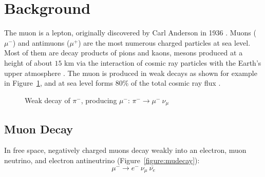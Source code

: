 
\section{Background}\label{background}

The muon is a lepton, originally discovered by Carl Anderson in 1936
\cite{anderson}. Muons ($\mu^-$) and antimuons ($\mu^+$) are the most
numerous charged particles at sea level\cite{pdg}. Most of them are
decay products of pions and kaons, mesons produced at a height of
about $15$ km via the interaction of cosmic ray particles with the
Earth's upper atmosphere \cite{amsler}. The muon is produced in weak
decays as shown for example in Figure~\ref{figure:pidecay}, and at sea
level forms $80\%$ of the total cosmic ray flux \cite[p.~8]{rossi}.

\begin{figure}[h]
\begin{center}
\caption{Weak decay of $\pi^-$, producing $\mu^-$: $\pi^- \rightarrow
\mu^-~\nu_{\mu}$}
\label{figure:pidecay}
\end{center}
\end{figure}


\subsection{Muon Decay}

In free space, negatively charged muons decay weakly into an electron,
muon neutrino, and electron antineutrino \cite{easwar}
(Figure~\ref{figure:mudecay}):
\begin{equation}\mu^- \rightarrow e^-~\nu_{\mu}~\overline{\nu_e}\label{mudecay}\end{equation}

